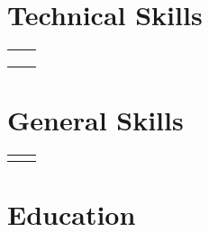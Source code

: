 \documentclass{article}
\begin{document}
\setlength{\parskip}{0pt}
\maketitle




\section{Technical Skills}
    \begin{flushleft}
        \begin{tabular}{>{\raggedleft\arraybackslash}p{1.2in} >{\raggedright\arraybackslash}p{5.9in}}
             \\
             \\
             \\
             \\
            
        \end{tabular}
    \end{flushleft}



\section{General Skills}

    \begin{flushleft}
        \begin{tabular}{>{\raggedleft\arraybackslash}p{1.2in} >{\raggedright\arraybackslash}p{5.9in}}
             \\
             \\
            
        \end{tabular}
    \end{flushleft}



\section{Education}
\end{document}
